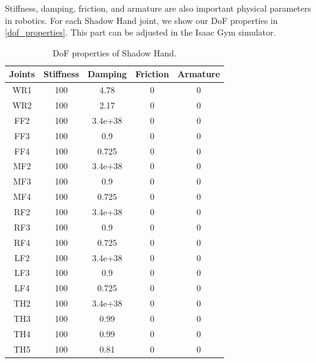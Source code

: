 \documentclass{article}
\begin{document}
Stiffness, damping, friction, and armature are also important physical parameters in robotics. For each Shadow Hand joint, we show our DoF properties in \autoref{dof_properties}. This part can be adjusted in the Isaac Gym simulator. 

\begin{table}[htbp]
    \centering
    \caption{DoF properties of Shadow Hand.}
    \begin{tabular}{ccccc}
    \toprule  %
    Joints& Stiffness & Damping & Friction & Armature\\\hline
    WR1 & 100 & 4.78 & 0 & 0\\\hline
    WR2 & 100 & 2.17 & 0 & 0\\\hline
    FF2 & 100 & 3.4e+38 & 0 & 0\\\hline
    FF3 & 100 & 0.9 & 0 & 0\\\hline
    FF4 & 100 & 0.725 & 0 & 0\\\hline
    MF2 & 100 & 3.4e+38 & 0 & 0\\\hline
    MF3 & 100 & 0.9 & 0 & 0\\\hline
    MF4 & 100 & 0.725 & 0 & 0\\\hline
    RF2 & 100 & 3.4e+38 & 0 & 0\\\hline
    RF3 & 100 & 0.9 & 0 & 0\\\hline
    RF4 & 100 & 0.725 & 0 & 0\\\hline
    LF2 & 100 & 3.4e+38 & 0 & 0\\\hline
    LF3 & 100 & 0.9 & 0 & 0\\\hline
    LF4 & 100 & 0.725 & 0 & 0\\\hline
    TH2 & 100 & 3.4e+38 & 0 & 0\\\hline
    TH3 & 100 & 0.99 & 0 & 0\\\hline
    TH4 & 100 & 0.99 & 0 & 0\\\hline
    TH5 & 100 & 0.81 & 0 & 0\\

    \bottomrule %
    \end{tabular}
    \label{dof_properties}
\end{table}
\end{document}
